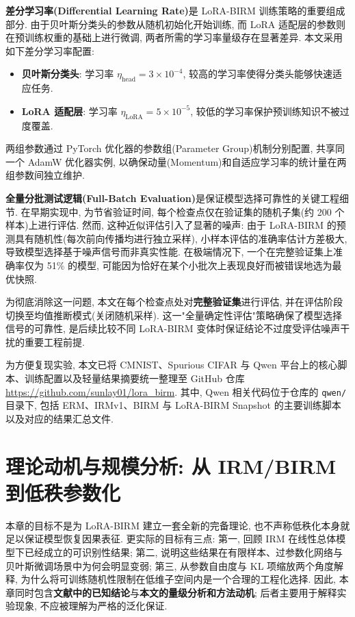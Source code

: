 \documentclass[a4paper,punct=banjiao,twoside]{ctexrep}
\theoremstyle{plain}
\theoremstyle{definition}
\theoremstyle{remark}
\begin{document}
\textbf{差分学习率(Differential Learning Rate)}是 LoRA-BIRM 训练策略的重要组成部分. 由于贝叶斯分类头的参数从随机初始化开始训练, 而 LoRA 适配层的参数则在预训练权重的基础上进行微调, 两者所需的学习率量级存在显著差异. 本文采用如下差分学习率配置:

\begin{itemize}
    \item \textbf{贝叶斯分类头}: 学习率 $\eta_{\text{head}} = 3 \times 10^{-4}$, 较高的学习率使得分类头能够快速适应任务.
    \item \textbf{LoRA 适配层}: 学习率 $\eta_{\text{LoRA}} = 5 \times 10^{-5}$, 较低的学习率保护预训练知识不被过度覆盖.
\end{itemize}

两组参数通过 PyTorch 优化器的参数组(Parameter Group)机制分别配置, 共享同一个 AdamW 优化器实例, 以确保动量(Momentum)和自适应学习率的统计量在两组参数间独立维护.

\textbf{全量分批测试逻辑(Full-Batch Evaluation)}是保证模型选择可靠性的关键工程细节. 在早期实现中, 为节省验证时间, 每个检查点仅在验证集的随机子集(约 200 个样本)上进行评估. 然而, 这种近似评估引入了显著的噪声: 由于 LoRA-BIRM 的预测具有随机性(每次前向传播均进行独立采样), 小样本评估的准确率估计方差极大, 导致模型选择基于噪声信号而非真实性能. 在极端情况下, 一个在完整验证集上准确率仅为 51\% 的模型, 可能因为恰好在某个小批次上表现良好而被错误地选为最优快照.

为彻底消除这一问题, 本文在每个检查点处对\textbf{完整验证集}进行评估, 并在评估阶段切换至均值推断模式(关闭随机采样). 这一"全量确定性评估"策略确保了模型选择信号的可靠性, 是后续比较不同 LoRA-BIRM 变体时保证结论不过度受评估噪声干扰的重要工程前提.

为方便复现实验, 本文已将 CMNIST、Spurious CIFAR 与 Qwen 平台上的核心脚本、训练配置以及轻量结果摘要统一整理至 GitHub 仓库 \href{https://github.com/sunlay01/lora_birm}{https://github.com/sunlay01/lora\_birm}. 其中, Qwen 相关代码位于仓库的 \texttt{qwen/} 目录下, 包括 ERM、IRMv1、BIRM 与 LoRA-BIRM Snapshot 的主要训练脚本以及对应的结果汇总文件.

\chapter{理论动机与规模分析: 从 IRM/BIRM 到低秩参数化}

本章的目标不是为 LoRA-BIRM 建立一套全新的完备理论, 也不声称低秩化本身就足以保证模型恢复因果表征. 更实际的目标有三点: 第一, 回顾 IRM 在线性总体模型下已经成立的可识别性结果; 第二, 说明这些结果在有限样本、过参数化网络与贝叶斯微调场景中为何会明显变弱; 第三, 从参数自由度与 KL 项缩放两个角度解释, 为什么将可训练随机性限制在低维子空间内是一个合理的工程化选择. 因此, 本章同时包含\textbf{文献中的已知结论}与\textbf{本文的量级分析和方法动机}; 后者主要用于解释实验现象, 不应被理解为严格的泛化保证.
\end{document}
